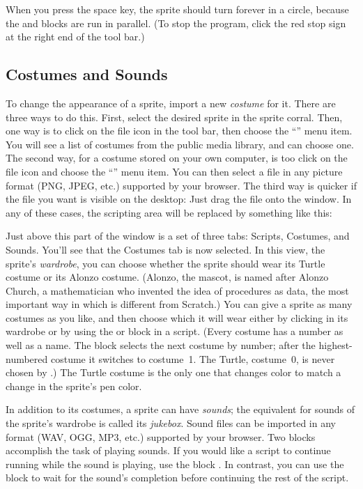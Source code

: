 \documentclass{report}
\begin{document}
When you press the space key, the sprite should turn forever in a circle, because the  and  blocks are run in parallel. (To stop the program, click the red stop sign  at the right end of the tool bar.)

\subsection{Costumes and Sounds}

To change the appearance of a sprite, import a new \emph{costume} for it. There are three ways to do this. First, select the desired sprite in the sprite corral. Then, one way is to click on the file icon  in the tool bar, then choose the ``'' menu item. You will see a list of costumes from the public media library, and can choose one. The second way, for a costume stored on your own computer, is too click on the file icon and choose the ``'' menu item. You can then select a file in any picture format (PNG, JPEG, etc.) supported by your browser. The third way is quicker if the file you want is visible on the desktop: Just drag the file onto the \Snap{} window. In any of these cases, the scripting area will be replaced by something like this:


Just above this part of the window is a set of three tabs: Scripts, Costumes, and Sounds. You'll see that the Costumes tab is now selected. In this view, the sprite's \emph{wardrobe}, you can choose whether the sprite should wear its Turtle costume or its Alonzo costume. (Alonzo, the \Snap{} mascot, is named after Alonzo Church, a mathematician who invented the idea of procedures as data, the most important way in which \Snap{} is different from Scratch.) You can give a sprite as many costumes as you like, and then choose which it will wear either by clicking in its wardrobe or by using the  or  block in a script. (Every costume has a number as well as a name. The  block selects the next costume by number; after the highest-numbered costume it switches to costume~1. The Turtle, costume~0, is never chosen by .) The Turtle costume is the only one that changes color to match a change in the sprite's pen color.

In addition to its costumes, a sprite can have \emph{sounds}; the equivalent for sounds of the sprite's wardrobe is called its \emph{jukebox}. Sound files can be imported in any format (WAV, OGG, MP3, etc.) supported by your browser. Two blocks accomplish the task of playing sounds. If you would like a script to continue running while the sound is playing, use the block . In contrast, you can use the  block to wait for the sound's completion before continuing the rest of the script.
\end{document}
